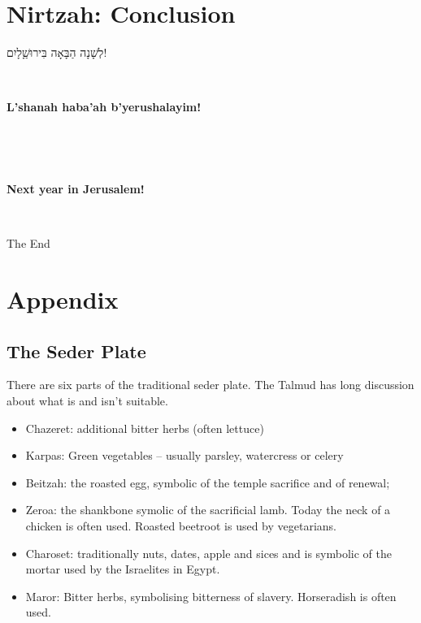 \documentclass[extrafontsizes,twoside,17pt,a4paper,openany]{memoir}
\newcommand{\HgHL}[1]{{\large\textbf{#1}\par\noindent\\[-.5em]}}
\newenvironment{HgHebrew}{\begin{hebrew}\noindent\large}{\end{hebrew}}
\newenvironment{HgEnglish}{\strut\\\noindent}{\vspace{1em}}
\newenvironment{HgTranslit}{\strut\\\noindent\begin{itshape}}{\end{itshape}\vspace{1em}}
\begin{document}
\newpage
\chapter{Nirtzah: Conclusion}

\vfill

\begin{HgHebrew}
  לְשָׁנָה הַבָּאָה בִּירוּשַָׁלָיִם!
  \vspace{-1em}
\end{HgHebrew}

\begin{HgTranslit}
  \HgHL{L'shanah haba'ah b'yerushalayim!}
  \vspace{-3em}
\end{HgTranslit}

\begin{HgEnglish}
  \HgHL{Next year in Jerusalem!}
\end{HgEnglish}

\vfill
\begin{center}
  The End
\end{center}
\newpage

\appendix

\thispagestyle{empty}
\chapter{Appendix}
\vspace*{-1cm}
\section*{The Seder Plate}

There are six parts of the traditional seder plate. The Talmud has
long discussion about what is and isn't suitable.
\begin{itemize}
\item Chazeret: additional bitter herbs (often lettuce)
\item Karpas: Green vegetables -- usually parsley, watercress or
  celery
\item Beitzah: the roasted egg, symbolic of the temple sacrifice and
  of renewal;
\item Zeroa: the shankbone symolic of the sacrificial lamb. Today the
  neck of a chicken is often used. Roasted beetroot is used by vegetarians.
\item Charoset: traditionally nuts, dates, apple and sices and is symbolic of
  the mortar used by the Israelites in Egypt.
\item Maror: Bitter herbs, symbolising bitterness of
  slavery. Horseradish is often used.
\end{itemize}
\end{document}
